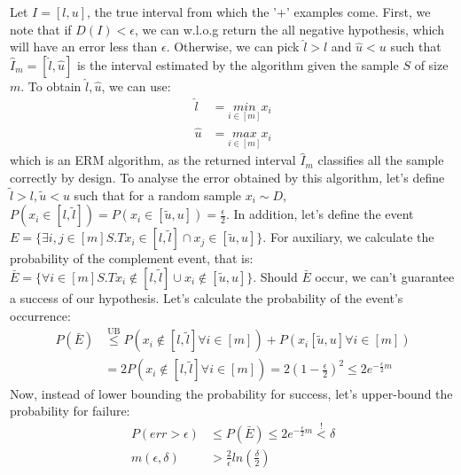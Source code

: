Let $I = [l, u]$, the true interval from which the '+' examples come.
First, we note that if $D(I) < \epsilon$, we can w.l.o.g return the all negative hypothesis, which will have an error less than $\epsilon$.
Otherwise, we can pick $\hat{l} > l$ and $\hat{u} < u$ such that $\hat{I}_m = [\hat{l}, \hat{u}]$ is the interval estimated by the algorithm given the sample $S$ of size $m$.
To obtain $\hat{l}, \hat{u}$, we can use:
\begin{equation*}
    \begin{split}
        \hat{l} &= \underset{i\in[m]}{min} x_i \\
        \hat{u} &= \underset{i\in[m]}{max} x_i
    \end{split}
\end{equation*}
which is an ERM algorithm, as the returned interval $\hat{I}_m$ classifies all the sample correctly by design.
To analyse the error obtained by this algorithm, let's define $\tilde{l} > l, \tilde{u} < u$ such that for a random sample $x_i \sim D$, $P(x_i \in [l, \tilde{l}]) = P(x_i \in [\tilde{u}, u]) = \frac{\epsilon}{2}$. In addition, let's define the event $E = \{\exists i,j \in [m] S.T x_i \in [l, \tilde{l}] \cap x_j \in [\tilde{u}, u]\}$.
For auxiliary, we calculate the probability of the complement event, that is:
$\bar{E} = \{\forall i \in [m] S.T x_i \notin [l, \tilde{l}] \cup x_i \notin [\tilde{u}, u]\}$.
Should $\bar{E}$ occur, we can't guarantee a success of our hypothesis. Let's calculate the probability of the event's occurrence:
\begin{equation*}
    \begin{split}        
        P(\bar{E}) &\overset{\text{UB}}{\leq} P(x_i \notin [l, \tilde{l}] \forall i \in [m]) + P(x_i [\tilde{u}, u] \forall i \in [m]) \\
        &= 2 P(x_i \notin [l, \tilde{l}] \forall i \in [m]) = 2(1- \frac{\epsilon}{2})^2 \leq 2e^{-\frac{\epsilon}{2}m}
    \end{split}
\end{equation*}
Now, instead of lower bounding the probability for success, let's upper-bound the probability for failure:
\begin{equation*}
    \begin{split}
        P(err > \epsilon) &\leq P(\bar{E}) \leq 2e^{-\frac{\epsilon}{2}m} \overset{!}{<} \delta \\
        m(\epsilon, \delta) &> \frac{2}{\epsilon} ln(\frac{\delta}{2})
    \end{split}
\end{equation*}